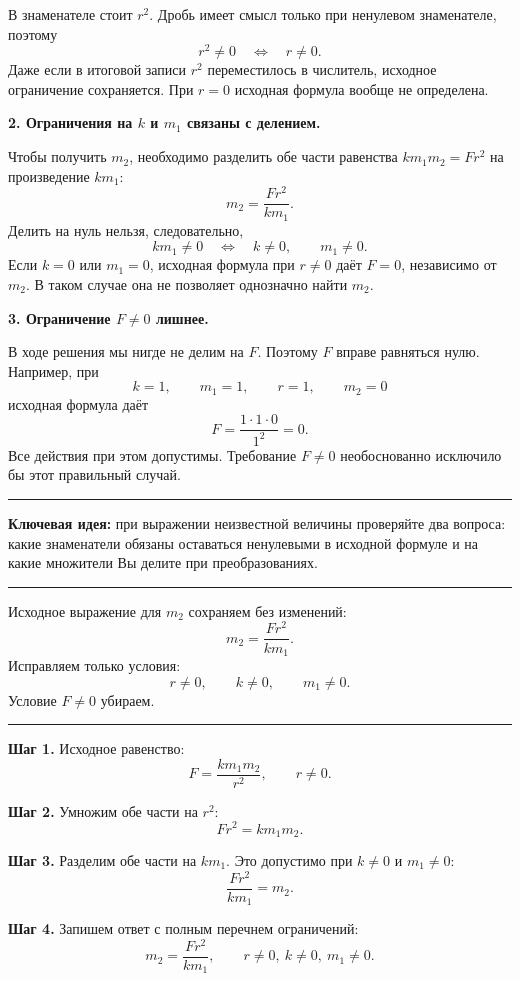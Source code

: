 \documentclass[a4paper,12pt]{article}
\newcommand{\accentline}{\par\noindent\textcolor{accent}{\rule{\linewidth}{0.45pt}}\par}
\newcommand{\reviewheading}[1]{\Needspace{8\baselineskip}\par\vspace{0.75em}{\large\bfseries\textcolor{darkaccent}{#1}}\par\accentline}
\begin{document}
В знаменателе стоит \(r^2\). Дробь имеет смысл только при ненулевом
знаменателе, поэтому
\[
  r^2\ne0 \quad\Longleftrightarrow\quad \boxed{r\ne0}.
\]
Даже если в итоговой записи \(r^2\) переместилось в числитель,
исходное ограничение сохраняется.
При \(r=0\) исходная формула вообще не определена.

\textbf{2. Ограничения на \(k\) и \(m_1\) связаны с делением.}

Чтобы получить \(m_2\), необходимо разделить обе части равенства
\(k m_1 m_2=F r^2\) на произведение \(k m_1\):
\[
m_2=\frac{F r^2}{k m_1}.
\]
Делить на нуль нельзя, следовательно,
\[
  k m_1\ne0
  \quad\Longleftrightarrow\quad
  \boxed{k\ne0,\qquad m_1\ne0}.
\]
Если \(k=0\) или \(m_1=0\), исходная формула при \(r\ne0\)
даёт \(F=0\), независимо от \(m_2\). В таком случае она не позволяет
однозначно найти \(m_2\).

\textbf{3. Ограничение \(F\ne0\) лишнее.}

В ходе решения мы нигде не делим на \(F\). Поэтому \(F\) вправе
равняться нулю. Например, при
\[
  k=1,\qquad m_1=1,\qquad r=1,\qquad m_2=0
\]
исходная формула даёт
\[
  F=\frac{1\cdot1\cdot0}{1^2}=0.
\]
Все действия при этом допустимы. Требование \(F\ne0\)
необоснованно исключило бы этот правильный случай.

\clearpage
\reviewheading{Ключевая идея}

\textcolor{reviewblue}{\textbf{Ключевая идея:}}
при выражении неизвестной величины проверяйте два вопроса:
какие знаменатели обязаны оставаться ненулевыми в исходной формуле
и на какие множители Вы делите при преобразованиях.

\reviewheading{Исправление от последнего правильного шага}

Исходное выражение для \(m_2\) сохраняем без изменений:
\[
  m_2=\frac{F r^2}{k m_1}.
\]
Исправляем только условия:
\[
  \boxed{r\ne0,\qquad k\ne0,\qquad m_1\ne0}.
\]
Условие \(F\ne0\) убираем.

\reviewheading{Полное правильное решение}

\textbf{Шаг 1.} Исходное равенство:
\[
  F=\frac{k m_1 m_2}{r^2},\qquad r\ne0.
\]

\textbf{Шаг 2.} Умножим обе части на \(r^2\):
\[
  F r^2=k m_1 m_2.
\]

\textbf{Шаг 3.} Разделим обе части на \(k m_1\).
Это допустимо при \(k\ne0\) и \(m_1\ne0\):
\[
  \frac{F r^2}{k m_1}=m_2.
\]

\textbf{Шаг 4.} Запишем ответ с полным перечнем ограничений:
\[
\boxed{
  m_2=\frac{F r^2}{k m_1},
  \qquad r\ne0,\ k\ne0,\ m_1\ne0.
}
\]
\end{document}
